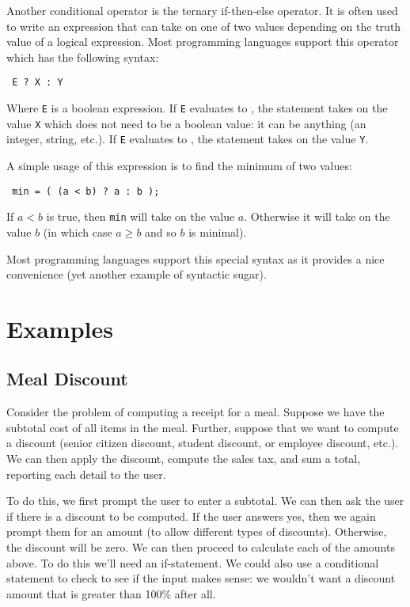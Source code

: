 Another conditional operator is the ternary if-then-else operator.  It is often 
used to write an expression that can take on one of two values depending on the
truth value of a logical expression.  Most programming languages support this operator
which has the following syntax:

\texttt{  E ? X : Y}

Where \texttt{E} is a boolean expression.  If \texttt{E} evaluates to \True, the
statement takes on the value \texttt{X} which does not need to be a boolean
value: it can be anything (an integer, string, etc.).  If \texttt{E} evaluates to \False, 
the statement takes on the value \texttt{Y}.  

A simple usage of this expression is to find the minimum of two values: 

\texttt{  min = ( (a < b) ? a : b );} 

If $a < b$ is true, then \texttt{min} will take on the value $a$.  Otherwise it will take
on the value $b$ (in which case $a \geq b$ and so $b$ is minimal).

Most programming languages support this special syntax as it provides a nice convenience
(yet another example of \gls{syntactic sugar}).

\section{Examples}

\subsection{Meal Discount}

Consider the problem of computing a receipt for a meal.  Suppose we have the 
subtotal cost of all items in the meal.  Further, suppose that we want to compute
a discount (senior citizen discount, student discount, or employee discount, etc.).
We can then apply the discount, compute the sales tax, and sum a total, reporting
each detail to the user.

To do this, we first prompt the user to enter a subtotal.  We can then ask the
user if there is a discount to be computed.  If the user answers yes, then we
again prompt them for an amount (to allow different types of discounts).  Otherwise,
the discount will be zero.  We can then proceed to calculate each of the amounts
above.  To do this we'll need an if-statement.  We could also use a conditional
statement to check to see if the input makes sense: we wouldn't want a discount
amount that is greater than 100\% after all.

